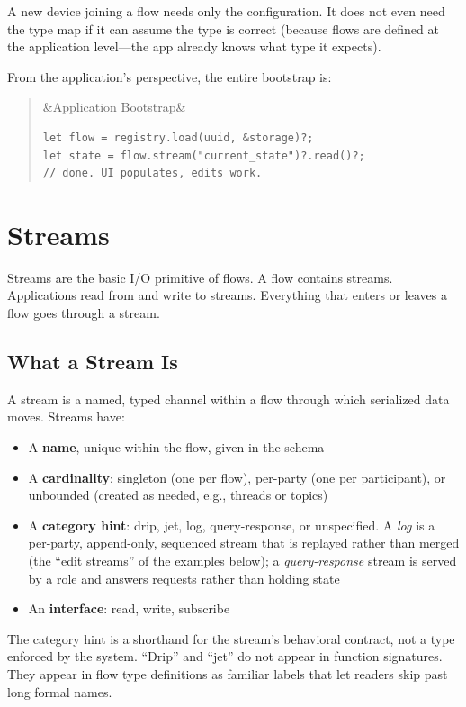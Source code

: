 \documentclass[11pt, letterpaper]{article}
\newenvironment{pseudocode}[1][]
  {\par\medskip\begin{quote}\small
   \ifx&#1&\else\noindent{\bfseries\color{rimblue} #1}\par\smallskip\fi
   \ttfamily}
  {\end{quote}\medskip}
\begin{document}
A new device joining a flow needs only the configuration. It does not even need the type
map if it can assume the type is correct (because flows are defined at the application
level---the app already knows what type it expects).

From the application's perspective, the entire bootstrap is:
\begin{pseudocode}[Application Bootstrap]
\begin{verbatim}
let flow = registry.load(uuid, &storage)?;
let state = flow.stream("current_state")?.read()?;
// done. UI populates, edits work.
\end{verbatim}
\end{pseudocode}


\newpage
\section{Streams}
\label{sec:streams}

Streams are the basic I/O primitive of flows. A flow contains streams. Applications
read from and write to streams. Everything that enters or leaves a flow goes through
a stream.

\subsection{What a Stream Is}

A stream is a named, typed channel within a flow through which serialized data moves.
Streams have:

\begin{itemize}[leftmargin=2em]
  \item A \textbf{name}, unique within the flow, given in the schema
  \item A \textbf{cardinality}: singleton (one per flow), per-party (one per participant),
    or unbounded (created as needed, e.g., threads or topics)
  \item A \textbf{category hint}: drip, jet, log, query-response, or unspecified. A
    \emph{log} is a per-party, append-only, sequenced stream that is replayed rather
    than merged (the ``edit streams'' of the examples below); a \emph{query-response}
    stream is served by a role and answers requests rather than holding state
  \item An \textbf{interface}: read, write, subscribe
\end{itemize}

The category hint is a shorthand for the stream's behavioral contract, not a type
enforced by the system. ``Drip'' and ``jet'' do not appear in function signatures.
They appear in flow type definitions as familiar labels that let readers skip past
long formal names.
\end{document}
